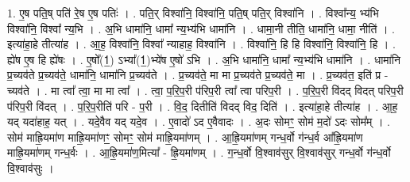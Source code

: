 \documentclass[17pt]{extarticle}
\begin{document}
1. ए॒ष पति॒ष् पति॑ रे॒ष ए॒ष पतिः॑ । . पति॒र् विश्वा॑नि॒ विश्वा॑नि॒ पति॒ष् पति॒र् विश्वा॑नि । . विश्वा᳚न्य॒ भ्य॑भि विश्वा॑नि॒ विश्वा᳚ न्य॒भि । . अ॒भि धामा॑नि॒ धामा᳚ न्य॒भ्य॑भि धामा॑नि । . धामा॒नी तीति॒ धामा॑नि॒ धामा॒ नीति॑ । . इत्या॑हा॒हे तीत्या॑ह । . आ॒ह॒ विश्वा॑नि॒ विश्वा᳚ न्याहाह॒ विश्वा॑नि । . विश्वा॑नि॒ हि हि विश्वा॑नि॒ विश्वा॑नि॒ हि । . ह्ये॑ष ए॒ष हि ह्ये॑षः । . ए॒षो᳚(1॒) ऽभ्या᳚(1॒)भ्ये॑ष ए॒षो॑ ऽभि । . अ॒भि धामा॑नि॒ धामा᳚ न्य॒भ्य॑भि धामा॑नि । . धामा॑नि प्र॒च्यव॑ते प्र॒च्यव॑ते॒ धामा॑नि॒ धामा॑नि प्र॒च्यव॑ते । . प्र॒च्यव॑ते॒ मा मा प्र॒च्यव॑ते प्र॒च्यव॑ते॒ मा । . प्र॒च्यव॑त॒ इति॑ प्र - च्यव॑ते । . मा त्वा᳚ त्वा॒ मा मा त्वा᳚ । . त्वा॒ प॒रि॒प॒री प॑रिप॒री त्वा᳚ त्वा परिप॒री । . प॒रि॒प॒री वि॑दद् विदत् परिप॒री प॑रिप॒री वि॑दत् । . प॒रि॒प॒रीति॑ परि - प॒री । . वि॒द॒ दितीति॑ विदद् विद॒ दिति॑ । . इत्या॑हा॒हे तीत्या॑ह । . आ॒ह॒ यद् यदा॑हाह॒ यत् । . यदे॒वैव यद् यदे॒व । . ए॒वादो॑ ऽद ए॒वैवादः । . अ॒दः सोमꣳ॒॒ सोम॑ म॒दो॑ ऽदः सोम᳚म् । . सोम॑ माह्रि॒यमा॑ण माह्रि॒यमा॑णꣳ॒॒ सोमꣳ॒॒ सोम॑ माह्रि॒यमा॑णम् । . आ॒ह्रि॒यमा॑णम् गन्ध॒र्वो ग॑न्ध॒र्व आ᳚ह्रि॒यमा॑ण माह्रि॒यमा॑णम् गन्ध॒र्वः । . आ॒ह्रि॒यमा॑ण॒मित्या᳚ - ह्रि॒यमा॑णम् । . ग॒न्ध॒र्वो वि॒श्वाव॑सुर् वि॒श्वाव॑सुर् गन्ध॒र्वो ग॑न्ध॒र्वो वि॒श्वाव॑सुः । \newline
\end{document}
